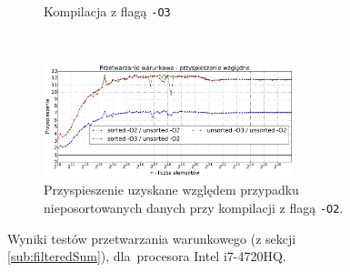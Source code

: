 \begin{figure}
\begin{subfigure}[c]{0.45\textwidth}
        \caption{Kompilacja z flagą \texttt{-O3}}
    \end{subfigure}
    \\
    \vspace{0.55cm}
    \begin{subfigure}[c]{1.0\textwidth}
        \centering
        \includegraphics[width=0.80\textwidth]{images/benchs/filtered_sum_normalized}
        \caption{Przyspieszenie uzyskane względem przypadku nieposortowanych danych przy kompilacji z flagą \texttt{-O2}.}
        \label{fig:filteredSumRelative}
    \end{subfigure}
    \caption{Wyniki testów przetwarzania warunkowego (z sekcji \ref{sub:filteredSum}), dla~procesora Intel i7-4720HQ.}
    \label{fig:filteredSum}
\end{figure}

\clearpage

